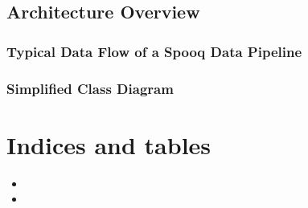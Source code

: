 \documentclass[a4paper,10pt, twoside,english]{sphinxmanual}
\begin{document}
\section{Architecture Overview}
\label{\detokenize{architecture:architecture-overview}}\label{\detokenize{architecture:architecture}}\label{\detokenize{architecture::doc}}

\subsection{Typical Data Flow of a Spooq Data Pipeline}
\label{\detokenize{architecture:typical-data-flow-of-a-spooq-data-pipeline}}
\noindent{}


\subsection{Simplified Class Diagram}
\label{\detokenize{architecture:simplified-class-diagram}}
\noindent{}


\chapter{Indices and tables}
\label{\detokenize{index:indices-and-tables}}\begin{itemize}
\item {} 

\item {} 

\end{itemize}
\end{document}
